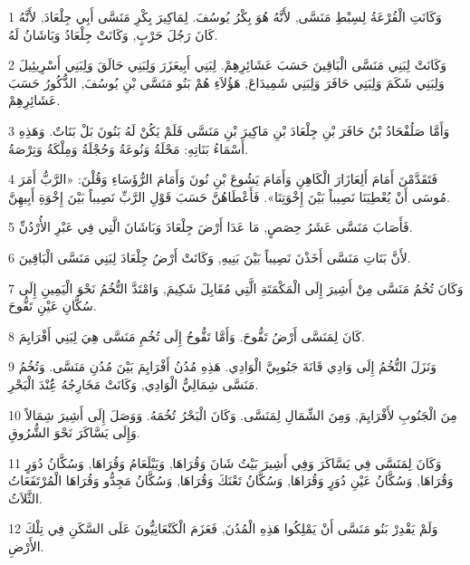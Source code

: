 \par 1 وَكَانَتِ الْقُرْعَةُ لِسِبْطِ مَنَسَّى, لأَنَّهُ هُوَ بِكْرُ يُوسُفَ. لِمَاكِيرَ بِكْرِ مَنَسَّى أَبِي جِلْعَادَ, لأَنَّهُ كَانَ رَجُلَ حَرْبٍ, وَكَانَتْ جِلْعَادُ وَبَاشَانُ لَهُ.
\par 2 وَكَانَتْ لِبَنِي مَنَسَّى الْبَاقِينَ حَسَبَ عَشَائِرِهِمْ. لِبَنِي أَبِيعَزَرَ وَلِبَنِي حَالَقَ وَلِبَنِي أَسْرِيئِيلَ وَلِبَنِي شَكَمَ وَلِبَنِي حَافَرَ وَلِبَنِي شَمِيدَاعَ, هَؤُلاَءِ هُمْ بَنُو مَنَسَّى بْنِ يُوسُفَ, الذُّكُورُ حَسَبَ عَشَائِرِهِمْ.
\par 3 وَأَمَّا صَلُفْحَادُ بْنُ حَافَرَ بْنِ جِلْعَادَ بْنِ مَاكِيرَ بْنِ مَنَسَّى فَلَمْ يَكُنْ لَهُ بَنُونَ بَلْ بَنَاتٌ. وَهَذِهِ أَسْمَاءُ بَنَاتِهِ: مَحْلَةُ وَنُوعَةُ وَحُجْلَةُ وَمِلْكَةُ وَتِرْصَةُ.
\par 4 فَتَقَدَّمْنَ أَمَامَ أَلِعَازَارَ الْكَاهِنِ وَأَمَامَ يَشُوعَ بْنِ نُونَ وَأَمَامَ الرُّؤَسَاءِ وَقُلْنَ: «الرَّبُّ أَمَرَ مُوسَى أَنْ يُعْطِيَنَا نَصِيباً بَيْنَ إِخْوَتِنَا». فَأَعْطَاهُنَّ حَسَبَ قَوْلِ الرَّبِّ نَصِيباً بَيْنَ إِخْوَةِ أَبِيهِنَّ.
\par 5 فَأَصَابَ مَنَسَّى عَشَرُ حِصَصٍ, مَا عَدَا أَرْضَ جِلْعَادَ وَبَاشَانَ الَّتِي فِي عَبْرِ الأُرْدُنِّ.
\par 6 لأَنَّ بَنَاتِ مَنَسَّى أَخَذْنَ نَصِيباً بَيْنَ بَنِيهِ, وَكَانَتْ أَرْضُ جِلْعَادَ لِبَنِي مَنَسَّى الْبَاقِينَ.
\par 7 وَكَانَ تُخُمُ مَنَسَّى مِنْ أَشِيرَ إِلَى الْمَكْمَتَةِ الَّتِي مُقَابِلَ شَكِيمَ, وَامْتَدَّ التُّخُمُ نَحْوَ الْيَمِينِ إِلَى سُكَّانِ عَيْنِ تَفُّوحَ.
\par 8 كَانَ لِمَنَسَّى أَرْضُ تَفُّوحَ. وَأَمَّا تَفُّوحُ إِلَى تُخُمِ مَنَسَّى هِيَ لِبَنِي أَفْرَايِمَ.
\par 9 وَنَزَلَ التُّخُمُ إِلَى وَادِي قَانَةَ جَنُوبِيَّ الْوَادِي. هَذِهِ مُدُنُ أَفْرَايِمَ بَيْنَ مُدُنِ مَنَسَّى. وَتُخُمُ مَنَسَّى شِمَالِيُّ الْوَادِي, وَكَانَتْ مَخَارِجُهُ عَُِنْدَ الْبَحْرِ.
\par 10 مِنَ الْجَنُوبِ لأَفْرَايِمَ, وَمِنَ الشِّمَالِ لِمَنَسَّى. وَكَانَ الْبَحْرُ تُخُمَهُ. وَوَصَلَ إِلَى أَشِيرَ شِمَالاً وَإِلَى يَسَّاكَرَ نَحْوَ الشُّرُوقِ.
\par 11 وَكَانَ لِمَنَسَّى فِي يَسَّاكَرَ وَفِي أَشِيرَ بَيْتُ شَانَ وَقُرَاهَا, وَيَبْلَعَامُ وَقُرَاهَا, وَسُكَّانُ دُوَرٍ وَقُرَاهَا, وَسُكَّانُ عَيْنِ دُوَرٍ وَقُرَاهَا, وَسُكَّانُ تَعْنَكَ وَقُرَاهَا, وَسُكَّانُ مَجِدُّو وَقُرَاهَا الْمُرْتَفَعَاتُ الثَّلاَثُ.
\par 12 وَلَمْ يَقْدِرْ بَنُو مَنَسَّى أَنْ يَمْلِكُوا هَذِهِ الْمُدُنَ, فَعَزَمَ الْكَنْعَانِيُّونَ عَلَى السَّكَنِ فِي تِلْكَ الأَرْضِ.
